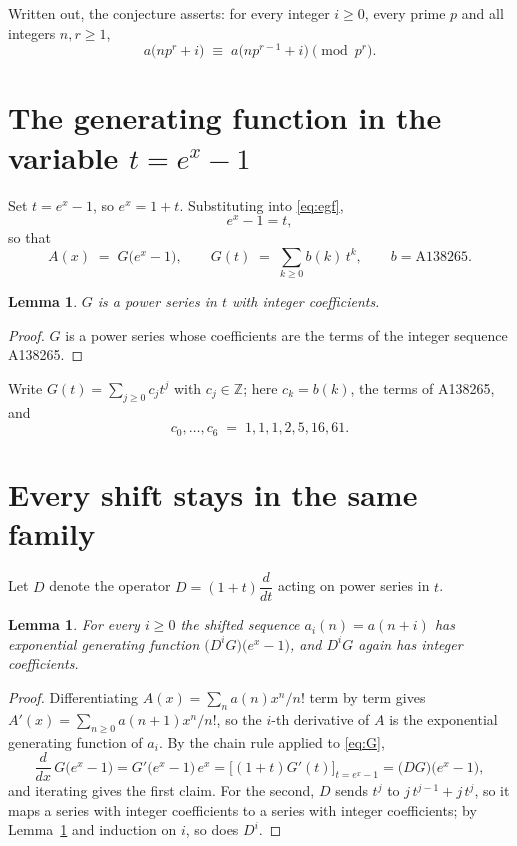 \documentclass[11pt,a4paper]{article}
\theoremstyle{plain}
\newtheorem{lemma}[theorem]{Lemma}
\theoremstyle{definition}
\begin{document}
Written out, the conjecture asserts: for every integer $i\ge0$, every prime $p$ and all
integers $n,r\ge1$,
\begin{equation}\label{eq:conj}
a\bigl(np^{r}+i\bigr)\;\equiv\;a\bigl(np^{r-1}+i\bigr)\pmod{p^{r}} .
\end{equation}

\section{The generating function in the variable $t=e^{x}-1$}

Set $t=e^{x}-1$, so $e^{x}=1+t$. Substituting into \eqref{eq:egf},
\[
e^{x}-1=t,
\]
so that
\begin{equation}\label{eq:G}
A(x)\;=\;G\bigl(e^{x}-1\bigr),\qquad G(t)\;=\;\sum_{k\ge 0} b(k)\,t^{k},\qquad b=\text{A138265}.
\end{equation}

\begin{lemma}\label{lem:int}
$G$ is a power series in $t$ with integer coefficients.
\end{lemma}

\begin{proof}
$G$ is a power series whose coefficients are the terms of the integer sequence A138265.
\end{proof}

Write $G(t)=\sum_{j\ge0}c_j t^{j}$ with $c_j\in\mathbb{Z}$; here $c_k=b(k)$, the terms of A138265, and
\[
c_0,\dots,c_6\;=\;1, 1, 1, 2, 5, 16, 61.
\]

\section{Every shift stays in the same family}

Let $D$ denote the operator $D=(1+t)\dfrac{d}{dt}$ acting on power series in $t$.

\begin{lemma}\label{lem:shift}
For every $i\ge0$ the shifted sequence $a_i(n)=a(n+i)$ has exponential generating function
$\bigl(D^{i}G\bigr)\bigl(e^{x}-1\bigr)$, and $D^{i}G$ again has integer coefficients.
\end{lemma}

\begin{proof}
Differentiating $A(x)=\sum_n a(n)x^{n}/n!$ term by term gives
$A'(x)=\sum_{n\ge0}a(n+1)x^{n}/n!$, so the $i$-th derivative of $A$ is the exponential
generating function of $a_i$. By the chain rule applied to \eqref{eq:G},
\[
\frac{d}{dx}\,G\bigl(e^{x}-1\bigr)=G'\bigl(e^{x}-1\bigr)\,e^{x}
=\bigl[(1+t)G'(t)\bigr]_{t=e^{x}-1}=\bigl(DG\bigr)\bigl(e^{x}-1\bigr),
\]
and iterating gives the first claim. For the second, $D$ sends $t^{j}$ to
$j\,t^{j-1}+j\,t^{j}$, so it maps a series with integer coefficients to a series with
integer coefficients; by Lemma~\ref{lem:int} and induction on $i$, so does $D^{i}$.
\end{proof}
\end{document}
